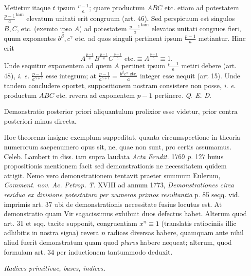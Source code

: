 Metietur itaque $t$ ipsum $\frac{p-1}{a}$; quare productum $ABC$ etc. etiam ad potestatem ${\frac{p-1}{a}}^{\mathrm{tam}}$ elevatum unitati erit congruum (art. 46). Sed perspicuum est singulos $B,C$, etc. (exemto ipso $A$) ad potestatem ${\frac{p-1}{a}}^{\mathrm{tam}}$ elevatos unitati congruos fieri, quum exponentes $b^\beta,c^\gamma$ etc. ad quos singuli pertinent ipsum $\frac{p-1}{a}$ metiantur. Hinc erit
\[A^{\frac{p-1}{a}}B^{\frac{p-1}{a}}C^{\frac{p-1}{a}}\text{ etc.}\equiv A^{\frac{p-1}{a}}\equiv1.\]
Unde sequitur exponentem ad quem $A$ pertinet ipsum $\frac{p-1}{a}$ metiri debere (art. 48), \emph{i. e.} $\frac{p-1}{a^{\alpha+1}}$ esse integrum; at $\frac{p-1}{a^{\alpha+1}}=\frac{b^\beta c^\gamma\text{ etc.}}{a}$ integer esse nequit (art 15). Unde tandem concludere oportet, suppositionem nostram consistere non posse, \emph{i. e.} productum $ABC$ etc. revera ad exponentem $p-1$ pertinere. \emph{Q. E. D.}

Demonstratio posterior priori aliquantulum prolixior esse videtur, prior contra posteriori minus directa.

Hoc theorema insigne exemplum suppeditat, quanta circumspectione in theoria numerorum saepenumero opus sit, ne, quae non sunt, pro certis assumamus. Celeb. Lambert in diss. iam supra laudata \emph{Acta Erudit.} 1769 \emph{p.} 127 huius propositionis mentionem facit sed demonstrationis ne necessitatem quidem attigit. Nemo vero demonstrationem tentavit praeter summum Eulerum, \emph{Comment. nov. Ac. Petrop. T.} XVIII ad annum 1773, \emph{Demonstrationes circa residua ex divisione potestatum per numeros primos resultantia} p. 85 seqq. vid. imprimis art. 37 ubi de demonstrationis necessitate fusius locutus est. At demonstratio quam Vir sagacissimus exhibuit duos defectus habet. Alterum quod art. 31 et sqq. tacite supponit, congruentiam $x^n\equiv1$ (translatis ratiociniis illic adhibitis in nostra signa) revera $n$ radices diversas habere, quamquam ante nihil aliud fuerit demonstratum quam quod \emph{plures} habere nequeat; alterum, quod formulam art. 34 per inductionem tantummodo deduxit.

\begin{center}\emph{Radices primitivae, bases, indices.}\end{center}

